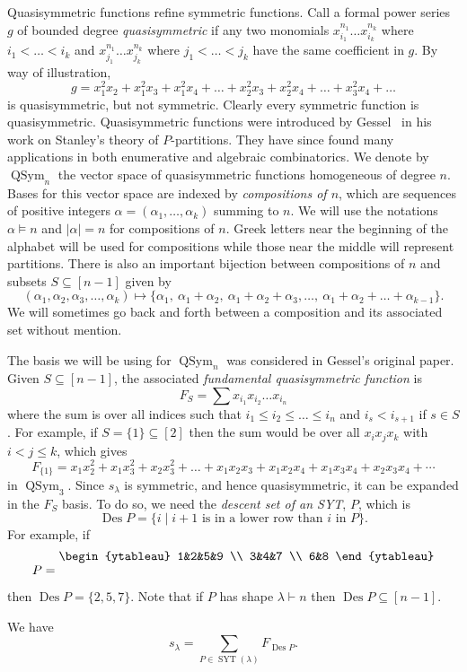 \documentclass[ALCO,ThmDefs,Unicode,epreuves]{cedram}
\newcommand{\comp}{\models}
\newcommand{\sbe}{\subseteq}
\newcommand{\ptn}{\vdash}
\newcommand{\al}{\alpha}
\newcommand{\la}{\lambda}
\DeclareMathOperator{\Des}{Des}
\DeclareMathOperator{\QSym}{{QSym}}
\DeclareMathOperator{\SYT}{SYT}
\begin{document}
Quasisymmetric functions refine symmetric functions. Call a formal power series $g$ of bounded degree \emph{quasisymmetric} if any two monomials $x_{i_1}^{n_1}\dots x_{i_k}^{n_k}$ where $i_1<\dots<i_k$ and $x_{j_1}^{n_1}\dots x_{j_k}^{n_k}$ where $j_1<\dots<j_k$ have the same coefficient in $g$. By way of illustration,
\[
g= x_1^2 x_2 + x_1^2 x_3 + x_1^2 x_4 + \dots + x_2^2 x_3 + x_2^2 x_4 + \dots + x_3^2 x_4 + \dots
\]
is quasisymmetric, but not symmetric. Clearly every symmetric function is quasisymmetric. Quasisymmetric functions were introduced by Gessel~\cite{ges:mpi} in his work on Stanley's theory of $P$-partitions. They have since found many applications in both enumerative and algebraic combinatorics. We denote by $\QSym_n$ the vector space of quasisymmetric functions homogeneous of degree $n$. Bases for this vector space are indexed by \emph{compositions of $n$}, which are sequences of positive integers $\al=(\al_1,\dots,\al_k)$ summing to $n$. We will use the notations $\al\comp n$ and $|\al|=n$ for compositions of $n$. Greek letters near the beginning of the alphabet will be used for compositions while those near the middle will represent partitions.
There is also an important bijection between compositions of $n$ and subsets $S\sbe[n-1]$ given by
\[
(\al_1,\al_2,\al_3,\ldots,\al_k)\mapsto \{\al_1,\ \al_1+\al_2,\ \al_1+\al_2+\al_3, \ldots,\ \al_1+\al_2+\dots+\al_{k-1}\}.
\]
We will sometimes go back and forth between a composition and its associated set without mention.

The basis we will be using for $\QSym_n$ was considered in Gessel's original paper. Given $S\sbe[n-1]$, the associated 
\emph{fundamental quasisymmetric function} is
\[
F_S = \sum x_{i_1} x_{i_2} \dots x_{i_n}
\]
where the sum is over all indices such that $i_1\le i_2\le \dots \le i_n$ and $i_s<i_{s+1}$ if $s\in S$. For example, if $S=\{1\}\sbe[2]$ then the sum would be over all $x_i x_j x_k$ with $i<j\le k$, which gives
\[
F_{\{1\}} = x_1 x_2^2 + x_1 x_3^2 + x_2 x_3^2 + \dots + x_1 x_2 x_3 + x_1 x_2 x_4 + x_1 x_3 x_4 + x_2 x_3 x_4 + \cdots
\]
in $\QSym_3$. Since $s_\la$ is symmetric, and hence quasisymmetric, it can be expanded in the $F_S$ basis. To do so, we need the \emph{descent set of an SYT}, $P$, which is
\[
\Des P =\{i \mid \text {$i+1$ is in a lower row than $i$ in $P$}\}.
\]
For example, if
\[
P=\raisebox{4mm}{\begin{ytableau} 1&2&5&9 \\ 3&4&7 \\ 6&8 \end{ytableau}}
\]
then $\Des P=\{2,5,7\}$. Note that if $P$ has shape $\la\ptn n$ then $\Des P\sbe[n-1]$.
\begin{theo}
\label{ges}
We have
\[
s_\la = \sum_{P\in\SYT(\la)} F_{\Des P}.
\]
\end{theo}
\end{document}
